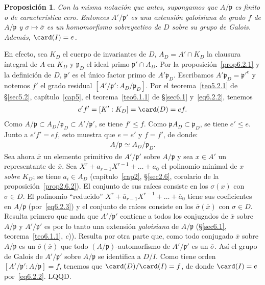 \documentclass[bibtotoc,leqno,spanish]{amsbook}
\newcommand{\idl}[1]{\mathfrak{#1}}
\newcommand{\QED}{LQQD.}
\newcommand{\oline}[1]{\overline{#1}}
\numberwithin{equation}{section}
\theoremstyle{note}
\theoremstyle{note}
\newtheorem{proposition}{Proposici\'on}
\theoremstyle{rem}
\numberwithin{theorem}{section}
\numberwithin{proposition}{section}
\numberwithin{definition}{section}
\numberwithin{lemma}{section}
\numberwithin{corollary}{section}
\numberwithin{example}{section}
\numberwithin{footnote}{section}%
\begin{document}
\begin{proposition}\label{prop6.2.2}
Con la misma notaci\'on que antes, supongamos que $A/\idl{p}$ es finito o de caracter\'istica cero. Entonces
$A'/\idl{p}'$ es una extensi\'on galoisiana de grado $f$ de $A/\idl{p}$ y $\sigma\mapsto\oline\sigma$ es un
homomorfismo sobreyectivo de $D$ sobre su grupo de Galois. Adem\'as, $\card(I) = e$.
\end{proposition}

En efecto, sea $K_{D}$ el cuerpo de invariantes de $D$, $A_{D} = A'\cap K_{D}$ la clausura \'integral de
$A$ en $K_{D}$ y $\idl{p}_{D}$ el ideal primo $\idl{p}'\cap A_{D}$. Por la
proposici\'on~\ref{prop6.2.1} y la definici\'on
de $D$, $\idl{p}'$ es el \'unico factor primo de $A'\idl{p}_{D}$. Escribamos $A'\idl{p}_{D} = \idl{p}'^{e}$
y notemos $f'$ el grado residual $[A'/\idl{p}':A_{D}/\idl{p}_{D}]$. Por el teorema~\ref{teo5.2.1} de \S\ref{sec5.2},
cap\'itulo~\ref{cap5},
el teorema~\ref{teo6.1.1} de \S\ref{sec6.1} y~\eqref{eq6.2.2}, tenemos
\begin{gather*}
e'f'=[K':K_{D}]=\card(D)=ef.
\end{gather*}
Como $A/\idl{p}\subset A_{D}/\idl{p}_{D}\subset A'/\idl{p}'$, se tiene $f'\leq f$. Como $\idl{p}A_{D}\subset\idl{p}_{D}$,
se tiene $e'\leq e$. Junto a $e'f'=ef$, esto muestra que $e=e'$ y $f=f'$, de donde:
\begin{gather}\label{eq6.2.3}
A/\idl{p}\simeq A_{D}/\idl{p}_{D}.
\end{gather}
Sea ahora $\oline x$ un elemento primitivo de $A'/\idl{p}'$ sobre $A/\idl{p}$ y sea $x\in A'$ un
representante de $\oline x$. Sea $X^{r}+a_{r-1}X^{r-1}+\dots+a_{0}$ el polinomio minimal de $x$
{\em sobre} $K_{D}$; se tiene $a_{i}\in A_{D}$ (cap\'itulo~\ref{cap2}, \S\ref{sec2.6},
corolario de la proposici\'on~\ref{prop2.6.2}).
El conjunto de sus ra\'ices consiste en los $\sigma(x)$ con $\sigma\in D$. El polinomio
``reducido'' $X^{r}+\oline a_{r-1}X^{r-1}+\dots+\oline a_{0}$ tiene sus coeficientes en $A/\idl{p}$
(por~\eqref{eq6.2.3}) y el conjunto de ra\'ices consiste en los $\oline\sigma(\oline x)$ con $\sigma\in D$. Resulta
primero que nada que $A'/\idl{p}'$ contiene a todos los conjugados de $\oline x$ sobre $A/\idl{p}$ y
$A'/\idl{p}'$ es por lo tanto una extensi\'on {\em galoisiana} de $A/\idl{p}$
(\S\ref{sec6.1}, teorema~\ref{teo6.1.1}, {\itshape c})). Resulta por otra parte que, como todo conjugado $\oline x$ sobre $A/\idl{p}$
es un $\oline\sigma(\oline x)$ que todo $(A/\idl{p})$-automorfismo de $A'/\idl{p}'$ es un $\oline\sigma$.
As\'i el grupo de Galois de $A'/\idl{p}'$ sobre $A/\idl{p}$ se identifica a $D/I$. Como tiene orden
$[A'/\idl{p}':A/\idl{p}]=f$, tenemos que $\card(D)/\card(I) = f$, de donde $\card(I) = e$ por~\eqref{eq6.2.2}. \QED
\end{document}
